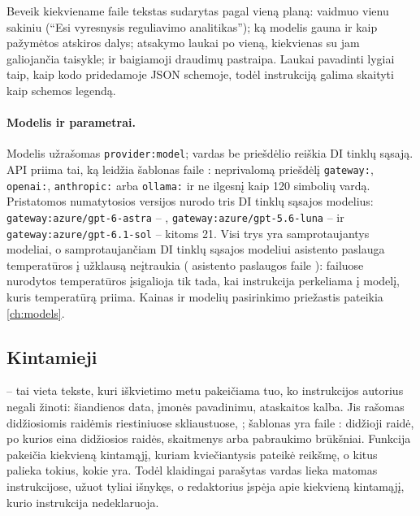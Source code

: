 Beveik kiekviename faile tekstas sudarytas pagal vieną planą: vaidmuo vienu sakiniu
(\enquote{Esi vyresnysis reguliavimo analitikas}); ką modelis gauna ir kaip pažymėtos
atskiros dalys; atsakymo laukai po vieną, kiekvienas su jam galiojančia taisykle; ir baigiamoji
draudimų pastraipa. Laukai pavadinti lygiai taip, kaip kodo pridedamoje JSON schemoje, todėl
instrukciją galima skaityti kaip schemos legendą.

\paragraph{Modelis ir parametrai.} Modelis užrašomas \texttt{provider:model}; vardas be
priešdėlio reiškia DI tinklų sąsają. API priima tai, ką leidžia šablonas  faile
: neprivalomą priešdėlį \texttt{gateway:}, \texttt{openai:},
\texttt{anthropic:} arba \texttt{ollama:} ir ne ilgesnį kaip 120 simbolių vardą. Pristatomos
numatytosios versijos nurodo tris DI tinklų sąsajos modelius:
\texttt{gateway:azure/gpt-6-astra} -- ,
\texttt{gateway:azure/gpt-5.6-luna} --  ir
\texttt{gateway:azure/gpt-6.1-sol} -- kitoms 21. Visi trys yra samprotaujantys modeliai, o
samprotaujančiam DI tinklų sąsajos modeliui asistento paslauga temperatūros į užklausą neįtraukia
( asistento paslaugos faile ): failuose
nurodytos temperatūros įsigalioja tik tada, kai instrukcija perkeliama į modelį, kuris
temperatūrą priima. Kainas ir modelių pasirinkimo priežastis pateikia \cref{ch:models}.

\subsection{Kintamieji}\label{sec:prompts:variables}

 -- tai vieta tekste, kuri iškvietimo metu pakeičiama tuo, ko instrukcijos
autorius negali žinoti: šiandienos data, įmonės pavadinimu, ataskaitos kalba. Jis rašomas
didžiosiomis raidėmis riestiniuose skliaustuose, ; šablonas yra
 faile : didžioji raidė, po kurios eina didžiosios
raidės, skaitmenys arba pabraukimo brūkšniai. Funkcija  pakeičia kiekvieną
kintamąjį, kuriam kviečiantysis pateikė reikšmę, o kitus palieka tokius, kokie yra. Todėl klaidingai
parašytas vardas lieka matomas instrukcijose, užuot tyliai išnykęs, o redaktorius įspėja apie
kiekvieną kintamąjį, kurio instrukcija nedeklaruoja.

